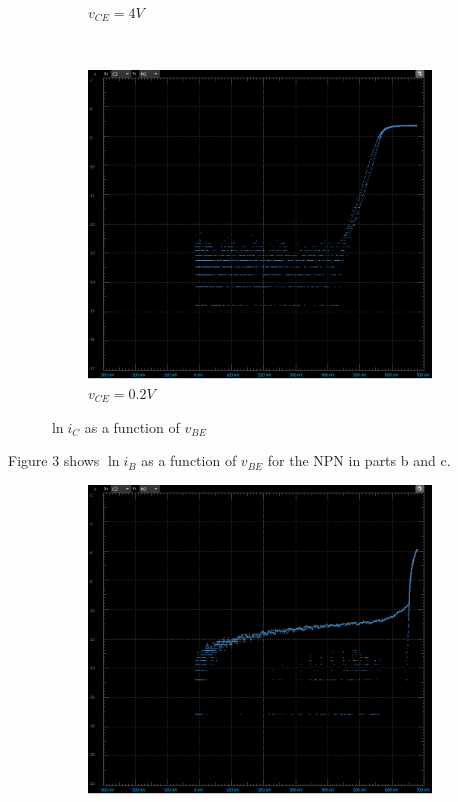 \documentclass[12pt]{article}
\begin{document}
\begin{enumerate}
\begin{enumerate}
\begin{figure}[h!]
\begin{subfigure}[b]{0.48\textwidth}
                \caption{$v_{CE} = 4V$}
            \end{subfigure}
            ~
            \begin{subfigure}[b]{0.48\textwidth}
                \includegraphics[width=\textwidth]{NCC02.png}
                \caption{$v_{CE} = 0.2V$}
            \end{subfigure}
            \caption{$\ln i_C$ as a function of $v_{BE}$}
        \end{figure} \newpage
        Figure 3 shows $\ln i_B$ as a function of $v_{BE}$ for the NPN in parts b and c. \\
        \begin{figure}[h!]
            \centering
            \begin{subfigure}[b]{0.48\textwidth}
                \includegraphics[width=\textwidth]{NBB4.png}

\end{subfigure}
\end{figure}
\end{enumerate}
\end{enumerate}
\end{document}
